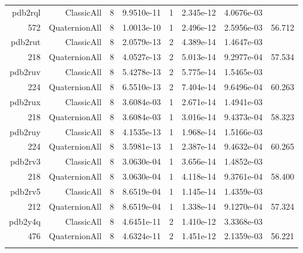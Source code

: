 \begin{xltabular}{\textwidth}{r|rcS[table-format=1.4e+2]cS[table-format=1.3e+2]S[table-format=1.4e+2]S[table-format=-1.3]}
pdb2rql & ClassicAll & 8 & 9.9510e-11 & 1 & 2.345e-12 & 4.0676e-03 & \\
572 & QuaternionAll & 8 & 1.0013e-10 & 1 & 2.496e-12 & 2.5956e-03 & 56.712\\  \addlinespace
pdb2rut & ClassicAll & 8 & 2.0579e-13 & 2 & 4.389e-14 & 1.4647e-03 & \\
218 & QuaternionAll & 8 & 4.0527e-13 & 2 & 5.013e-14 & 9.2977e-04 & 57.534\\  \addlinespace
pdb2ruv & ClassicAll & 8 & 5.4278e-13 & 2 & 5.775e-14 & 1.5465e-03 & \\
224 & QuaternionAll & 8 & 6.5510e-13 & 2 & 7.404e-14 & 9.6496e-04 & 60.263\\  \addlinespace
pdb2rux & ClassicAll & 8 & 3.6084e-03 & 1 & 2.671e-14 & 1.4941e-03 & \\
218 & QuaternionAll & 8 & 3.6084e-03 & 1 & 3.016e-14 & 9.4373e-04 & 58.323\\  \addlinespace
pdb2ruy & ClassicAll & 8 & 4.1535e-13 & 1 & 1.968e-14 & 1.5166e-03 & \\
224 & QuaternionAll & 8 & 3.5981e-13 & 1 & 2.387e-14 & 9.4632e-04 & 60.265\\  \addlinespace
pdb2rv3 & ClassicAll & 8 & 3.0630e-04 & 1 & 3.656e-14 & 1.4852e-03 & \\
218 & QuaternionAll & 8 & 3.0630e-04 & 1 & 4.118e-14 & 9.3761e-04 & 58.400\\  \addlinespace
pdb2rv5 & ClassicAll & 8 & 8.6519e-04 & 1 & 1.145e-14 & 1.4359e-03 & \\
212 & QuaternionAll & 8 & 8.6519e-04 & 1 & 1.338e-14 & 9.1270e-04 & 57.324\\  \addlinespace
pdb2y4q & ClassicAll & 8 & 4.6451e-11 & 2 & 1.410e-12 & 3.3368e-03 & \\
476 & QuaternionAll & 8 & 4.6324e-11 & 2 & 1.451e-12 & 2.1359e-03 & 56.221\\  \addlinespace
\end{xltabular}

